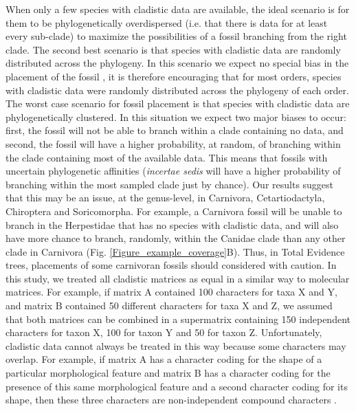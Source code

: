 When only a few species with cladistic data are available, the ideal scenario is for them to be phylogenetically overdispersed (i.e. that there is data for at least every sub-clade) to maximize the possibilities of a fossil branching from the right clade.
The second best scenario is that species with cladistic data are randomly distributed across the phylogeny. 
In this scenario we expect no special bias in the placement of the fossil \citep{GuillermeCooper}, it is therefore encouraging that for most orders, species with cladistic data were randomly distributed across the phylogeny of each order.
The worst case scenario for fossil placement is that species with cladistic data are phylogenetically clustered. 
In this situation we expect two major biases to occur: first, the fossil will not be able to branch within a clade containing no data, and second, the fossil will have a higher probability, at random, of branching within the clade containing most of the available data.
This means that fossils with uncertain phylogenetic affinities (\textit{incertae sedis} will have a higher probability of branching within the most sampled clade just by chance).
Our results suggest that this may be an issue, at the genus-level, in Carnivora, Cetartiodactyla, Chiroptera and Soricomorpha. 
For example, a Carnivora fossil will be unable to branch in the Herpestidae that has no species with cladistic data, and will also have more chance to branch, randomly, within the Canidae clade than any other clade in Carnivora (Fig. \ref{Figure_example_coverage}B).
Thus, in Total Evidence trees, placements of some carnivoran fossils should considered with caution. 
In this study, we treated all cladistic matrices as equal in a similar way to molecular matrices. 
For example, if matrix A contained 100 characters for taxa X and Y, and matrix B contained 50 different characters for taxa X and Z, we assumed that both matrices can be combined in a supermatrix containing 150 independent characters for taxon X, 100 for taxon Y and 50 for taxon Z.
Unfortunately, cladistic data cannot always be treated in this way because some characters may overlap.
For example, if matrix A has a character coding for the shape of a particular morphological feature and matrix B has a character coding for the presence of this same morphological feature and a second character coding for its shape, then these three characters are non-independent compound characters \citep{Brazeau2011}.
